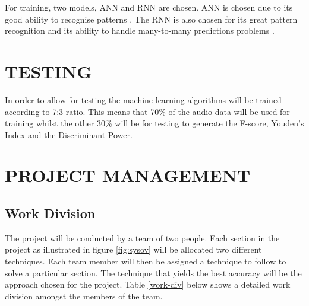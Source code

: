 \documentclass[10pt,twocolumn]{witseiepaper}
\begin{document}
For training, two models, ANN and RNN are chosen. ANN is chosen due to its good ability to recognise patterns \cite{demuth2014neural}. The RNN is also chosen for its great pattern recognition and its ability to handle many-to-many predictions problems \cite{he2019automatic}.
\section{TESTING}
In order to allow for testing the machine learning algorithms will be trained according to 7:3 ratio. This means that 70\% of the audio data will be used for training whilst the other 30\% will be for testing to generate the F-score, Youden’s Index and the Discriminant Power.

%



\section{PROJECT MANAGEMENT}

\subsection{Work Division}
The project will be conducted by a team of two people. Each section in the project as illustrated in figure \ref{fig:sysov}
will be allocated two different techniques. Each team member will then be assigned a technique to follow to solve a particular section. The technique that yields the best accuracy will be the approach chosen for the project. Table \ref{work-div} below shows a detailed work division amongst the members of the team.
\end{document}
